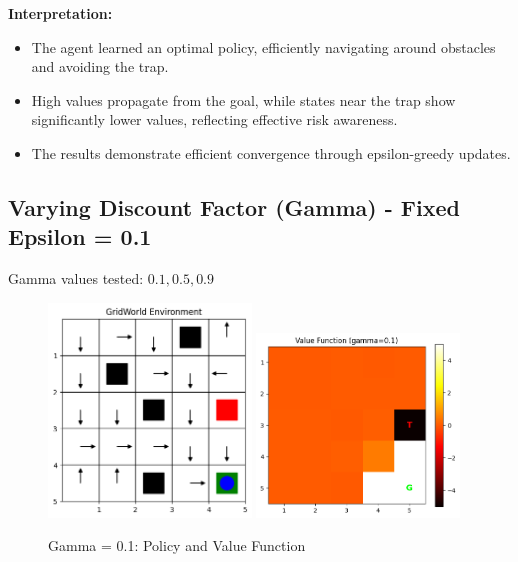 \documentclass[12pt]{article}
\begin{document}
\textbf{Interpretation:}
\begin{itemize}
  \item The agent learned an optimal policy, efficiently navigating around obstacles and avoiding the trap.
  \item High values propagate from the goal, while states near the trap show significantly lower values, reflecting effective risk awareness.
  \item The results demonstrate efficient convergence through epsilon-greedy updates.
\end{itemize}

\newpage
\subsection{Varying Discount Factor (Gamma) - Fixed Epsilon = 0.1}
Gamma values tested: \(0.1, 0.5, 0.9\)

\begin{figure}[htbp]
  \centering
  \includegraphics[width=0.48\textwidth]{images/part1_q2_gamma_0.1_policy.png}
  \includegraphics[width=0.48\textwidth]{images/part1_q2_gamma_0.1_value.png}
  \caption{Gamma = 0.1: Policy and Value Function}
\end{figure}
\end{document}
